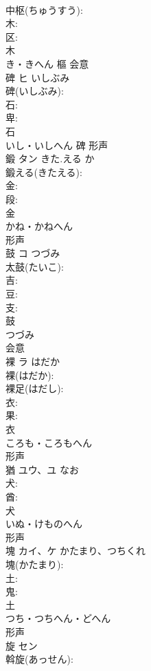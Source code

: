 \documentclass[8pt]{extreport}
\begin{document}
\begin{CJK}{UTF8}{min}
\\	中枢(ちゅうすう): 
\\	木: 
\\	区: 
\\	木	
\\	き・きへん	樞	会意 
\\	碑	ヒ	いしぶみ		
\\	碑(いしぶみ): 
\\	石: 
\\	卑: 
\\	石	
\\	いし・いしへん	碑	形声 
\\	鍛	タン	きた.える	か	
\\	鍛える(きたえる): 
\\	金: 
\\	段: 
\\	金	
\\	かね・かねへん	
\\	形声 
\\	鼓	コ	つづみ		
\\	太鼓(たいこ): 
\\	吉: 
\\	豆: 
\\	支: 
\\	鼓	
\\	つづみ	
\\	会意 
\\	裸	ラ	はだか		
\\	裸(はだか): 
\\	裸足(はだし): 
\\	衣: 
\\	果: 
\\	衣	
\\	ころも・ころもへん	
\\	形声 
\\	猶	ユウ、ユ	なお		
\\	犬: 
\\	酋: 
\\	犬	
\\	いぬ・けものへん	
\\	形声 
\\	塊	カイ、ケ	かたまり、つちくれ		
\\	塊(かたまり): 
\\	土: 
\\	鬼: 
\\	土	
\\	つち・つちへん・どへん	
\\	形声 
\\	旋	セン			
\\	斡旋(あっせん): 

\end{CJK}
\end{document}
